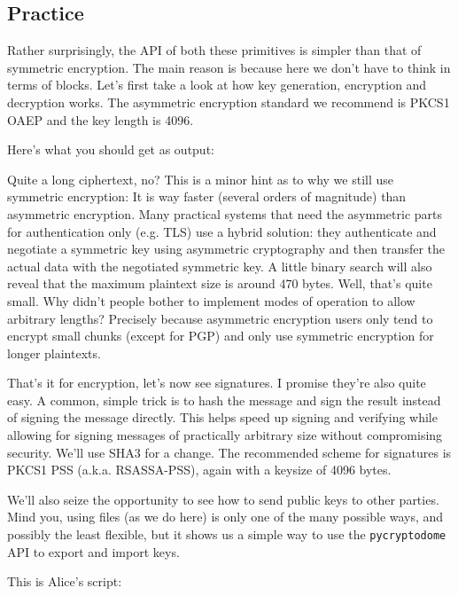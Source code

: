 \documentclass[a4paper,11pt]{article}
\begin{document}
  \subsection{Practice}
    Rather surprisingly, the API of both these primitives is simpler than that
    of symmetric encryption. The main reason is because here we don't have to
    think in terms of blocks. Let's first take a look at how key generation,
    encryption and decryption works. The asymmetric encryption standard we
    recommend is PKCS1 OAEP and the key length is 4096.

    \codelisting{\oaepusage}
    Here's what you should get as output:
    \outputlisting{\oaepusage}

    Quite a long ciphertext, no? This is a minor hint as to why we still use
    symmetric encryption: It is way faster (several orders of magnitude) than
    asymmetric encryption. Many practical systems that need the asymmetric parts
    for authentication only (e.g. TLS) use a hybrid solution: they authenticate
    and negotiate a symmetric key using asymmetric cryptography and then
    transfer the actual data with the negotiated symmetric key. A little binary
    search will also reveal that the maximum plaintext size is around 470 bytes.
    Well, that's quite small. Why didn't people bother to implement modes of
    operation to allow arbitrary lengths? Precisely because asymmetric
    encryption users only tend to encrypt small chunks (except for PGP) and
    only use symmetric encryption for longer plaintexts.

    That's it for encryption, let's now see signatures. I promise they're also
    quite easy. A common, simple trick is to hash the message and sign the
    result instead of signing the message directly. This helps speed up signing
    and verifying while allowing for signing messages of practically arbitrary
    size without compromising security. We'll use SHA3 for a change. The
    recommended scheme for signatures is PKCS1 PSS (a.k.a. RSASSA-PSS), again
    with a keysize of 4096 bytes.

    We'll also seize the opportunity to see how to send public keys to other
    parties. Mind you, using files (as we do here) is only one of the many
    possible ways, and possibly the least flexible, but it shows us a simple way
    to use the \texttt{pycryptodome} API to export and import keys.

    This is Alice's script:

    \codelisting{\pssusagealice}
\end{document}
